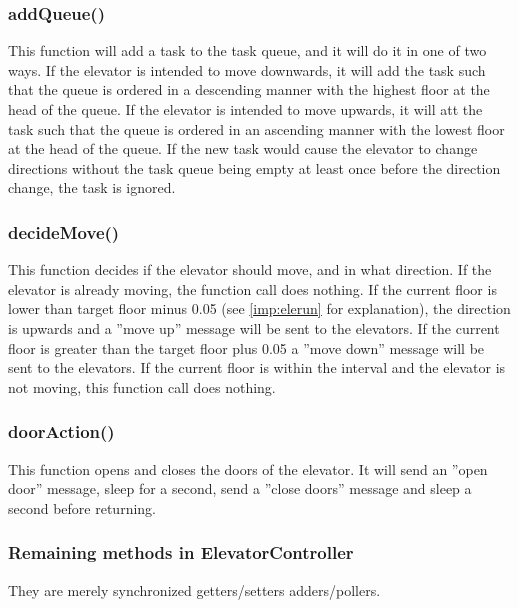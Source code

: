 \subsubsection{addQueue()}
\label{imp:addtask}
This function will add a task to the task queue, and it will do it in one of two ways.
If the elevator is intended to move downwards, it will add the task such that the queue is ordered in a descending manner with the highest floor at the head of the queue.\newline
If the elevator is intended to move upwards, it will att the task such that the queue is ordered in an ascending manner with the lowest floor at the head of the queue.
\newline
If the new task would cause the elevator to change directions without the task queue being empty at least once before the direction change, the task is ignored.

\subsubsection{decideMove()}
This function decides if the elevator should move, and in what direction.\newline
If the elevator is already moving, the function call does nothing.\newline
If the current floor is lower than target floor minus 0.05 (see \cref{imp:elerun} for explanation), the direction is upwards and a ''move up'' message will be sent to the elevators.\newline
If the current floor is greater than the target floor plus 0.05 a ''move down'' message will be sent to the elevators.\newline
If the current floor is within the interval and the elevator is not moving, this function call does nothing.

\subsubsection{doorAction()}
\label{imp:doorAction}
This function opens and closes the doors of the elevator.
It will send an ''open door'' message, sleep for a second, send a ''close doors'' message and sleep a second before returning.

\subsubsection{Remaining methods in ElevatorController}
They are merely synchronized getters/setters adders/pollers.

